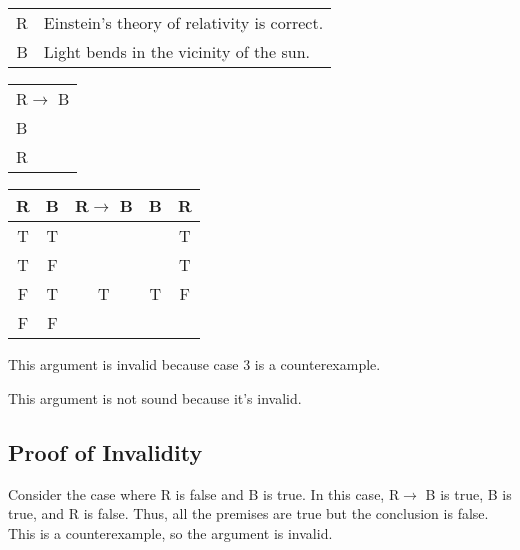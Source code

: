 \section{}
\centering
\begin{tabular}{r l}
    R & Einstein's theory of relativity is correct. \\
    B & Light bends in the vicinity of the sun.
\end{tabular}
\begin{tabular}{l}
    R$\rightarrow$ B\\
    B\\
    \hline
    R
\end{tabular}

\begin{tabular}{c|c||c|c||c}
    R & B & R$\rightarrow$ B & B & R \\
    \hline
    T & T &   &   & T \\
    T & F &   &   & T \\
    F & T & T & T & F \\
    F & F &   &   &  
\end{tabular}

\justifying
\noindent This argument is invalid because case 3 is a counterexample.

\noindent This argument is not sound because it's invalid.

\subsection*{Proof of Invalidity}
Consider the case where R is false and B is true. In this case, R$\rightarrow$ B is true, B is true, and R is false. Thus, all the premises are true but the conclusion is false. This is a counterexample, so the argument is invalid.